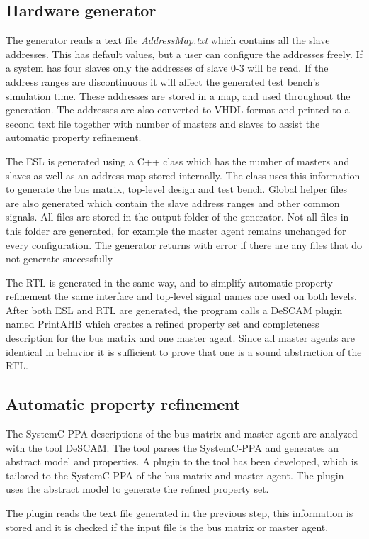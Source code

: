 \subsection{Hardware generator}
The generator reads a text file \textit{AddressMap.txt} which contains all the slave addresses. This has default values, but a user can configure the addresses freely. If a system has four slaves only the addresses of slave 0-3 will be read. If the address ranges are discontinuous it will affect the generated test bench's simulation time. These addresses are stored in a map, and used throughout the generation. The addresses are also converted to VHDL format and printed to a second text file together with number of masters and slaves to assist the automatic property refinement. \par
The ESL is generated using a C++ class which has the number of masters and slaves as well as an address map stored internally. The class uses this information to generate the bus matrix, top-level design and test bench. Global helper files are also generated which contain the slave address ranges and other common signals. All files are stored in the output folder of the generator. Not all files in this folder are generated, for example the master agent remains unchanged for every configuration. The generator returns with error if there are any files that do not generate successfully \par
The RTL is generated in the same way, and to simplify automatic property refinement the same interface and top-level signal names are used on both levels.
After both ESL and RTL are generated, the program calls a DeSCAM plugin named PrintAHB which creates a refined property set and completeness description for the
bus matrix and one master agent. Since all master agents are identical in behavior it is sufficient to prove that one is a sound abstraction of the RTL. 
   
\subsection{Automatic property refinement}
The SystemC-PPA descriptions of the bus matrix and master agent are analyzed with the tool DeSCAM. The tool parses the SystemC-PPA and generates an abstract
model and properties. A plugin to the tool has been developed, which is tailored to the SystemC-PPA of the bus matrix and master agent. The plugin uses the abstract model to generate the refined property set. \par
The plugin reads the text file generated in the previous step, this information is stored and it is checked if the input file is the bus matrix or master agent. 

